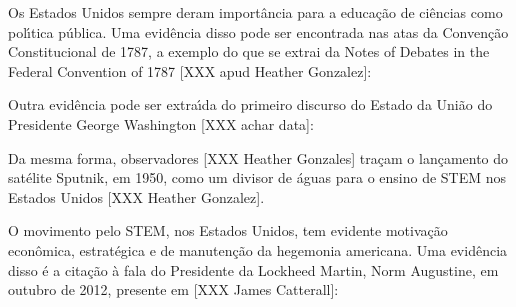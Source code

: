 \documentclass[
12pt,		%
openright,	%
twoside,  %
a4paper,			%
chapter=TITLE,		%
english,			%
french,				%
spanish,			%
brazil				%
]{USPSC-classe/USPSC}
\begin{document}
Os Estados Unidos sempre deram import\^ancia para a educa\c{c}\~ao de ci\^encias como pol\'{\i}tica p\'ublica. Uma evid\^encia disso pode ser encontrada nas atas da Conven\c{c}\~ao Constitucional de 1787, a exemplo do que se extrai da \textquotedbl Notes of Debates in the Federal Convention of 1787 [XXX apud Heather Gonzalez]:











\noindent\begin{center}\mbox{\centering{}}\end{center}


Outra evid\^encia pode ser extra\'{\i}da do primeiro discurso do Estado da Uni\~ao do Presidente George Washington [XXX achar data]:











\noindent\begin{center}\mbox{\centering{}}\end{center}


Da mesma forma, observadores [XXX Heather Gonzales] tra\c{c}am o lan\c{c}amento do sat\'elite Sputnik, em 1950, como um divisor de \'aguas para o ensino de STEM nos Estados Unidos [XXX Heather Gonzalez].










O movimento pelo STEM, nos Estados Unidos, tem evidente motiva\c{c}\~ao econ\^omica, estrat\'egica e de manuten\c{c}\~ao da hegemonia americana. Uma evid\^encia disso \'e a cita\c{c}\~ao \`a fala do Presidente da Lockheed Martin, Norm Augustine, em outubro de 2012, presente em [XXX James Catterall]:
\end{document}

